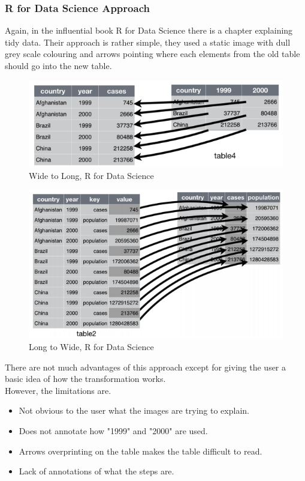 \subsubsection{R for Data Science Approach}

Again, in the influential book R for Data Science there is a chapter explaining tidy data. Their approach is rather simple, they used a static image with dull grey scale colouring and arrows pointing where each elements from the old table should go into the new table.

\begin{figure}[H]
    \centering
    \includegraphics[scale = 0.5]{Masters-Thesis/img/r4dsw2l.png}
    \caption{Wide to Long, R for Data Science}
    \label{fig:r4dsw2l}
\end{figure}

\begin{figure}[H]
    \centering
    \includegraphics[scale = 0.5]{Masters-Thesis/img/r4dsl2w.png}
    \caption{Long to Wide, R for Data Science}
    \label{fig:r4dsl2w}
\end{figure}

There are not much advantages of this approach except for giving the user a basic idea of how the transformation works. \\

However, the limitations are.
\begin{itemize}
    \item Not obvious to the user what the images are trying to explain.
    \item Does not annotate how "1999" and "2000" are used. 
    \item Arrows overprinting on the table makes the table difficult to read.
    \item Lack of annotations of what the steps are.
\end{itemize}


